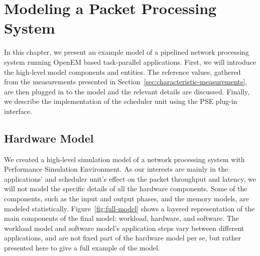 \chapter{Modeling a Packet Processing System}
\label{chapter:modeling-a-packet-processing-system}

In this chapter, we present an example model of a pipelined network processing system running OpenEM based task-parallel applications. First, we will introduce the high-level model components and entities. The reference values, gathered from the measurements presented in Section~\ref{sec:characteristic-measurements}, are then plugged in to the model and the relevant details are discussed. Finally, we describe the implementation of the scheduler unit using the PSE plug-in interface.

\section{Hardware Model}
\label{sec:hardware-model}
We created a high-level simulation model of a network processing system with Performance Simulation Environment. As our interests are mainly in the applications' and scheduler unit's effect on the packet throughput and latency, we will not model the specific details of all the hardware components. Some of the components, such as the input and output phases, and the memory models, are modeled statistically. Figure~\ref{fig:full-model} shows a layered representation of the main components of the final model: workload, hardware, and software. The workload model and software model's application steps vary between different applications, and are not fixed part of the hardware model per se, but rather presented here to give a full example of the model.

